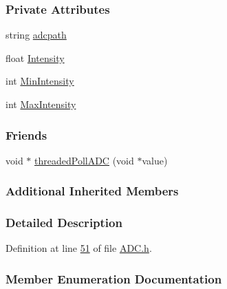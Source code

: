 \subsubsection*{Private Attributes}
\begin{DoxyCompactItemize}
\item 
string \hyperlink{class_hardware_1_1_a_d_c_a820ce4f097a70b95246049f9ea01df21}{adcpath}
\item 
float \hyperlink{class_hardware_1_1_a_d_c_a38a0f00558a3de01b3bce567643dae4a}{Intensity}
\item 
int \hyperlink{class_hardware_1_1_a_d_c_af73224014dddfdd80f77b80e6ed82c13}{Min\+Intensity}
\item 
int \hyperlink{class_hardware_1_1_a_d_c_a8fb4ac4b41ff54a44e57e9ce8bc5bd93}{Max\+Intensity}
\end{DoxyCompactItemize}
\subsubsection*{Friends}
\begin{DoxyCompactItemize}
\item 
void $\ast$ \hyperlink{class_hardware_1_1_a_d_c_a626f06adb6721fc5fe0aa7f76a770770}{threaded\+Poll\+A\+D\+C} (void $\ast$value)
\end{DoxyCompactItemize}
\subsubsection*{Additional Inherited Members}


\subsubsection{Detailed Description}


Definition at line \hyperlink{_a_d_c_8h_source_l00051}{51} of file \hyperlink{_a_d_c_8h_source}{A\+D\+C.\+h}.



\subsubsection{Member Enumeration Documentation}
\hypertarget{class_hardware_1_1_a_d_c_adb1507998c096cbdf7031527f6a690cf}{}
